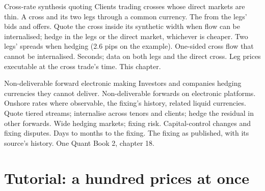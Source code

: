 \begin{strategyfile}{Cross-rate synthesis quoting}\label{strat:hf:fx-market-making:cross}
 Clients trading crosses whose direct markets are thin.
 A cross and its two legs through a common currency.
 The  from the legs' bids and offers.
 Quote the cross inside its synthetic width when flow can be internalised; hedge in the legs or the direct market,
whichever is cheaper.
 Two legs' spreads when hedging (2.6 pips on the example).
 One-sided cross flow that cannot be internalised.
 Seconds; data on both legs and the direct cross.
 Leg prices executable at the cross trade's time.
 This chapter.
\end{strategyfile}

\begin{strategyfile}{Non-deliverable forward electronic making}\label{strat:hf:fx-market-making:ndf}
 Investors and companies hedging currencies they cannot deliver.
 Non-deliverable forwards on electronic platforms.
 Onshore rates where observable, the fixing's history, related liquid currencies.
 Quote tiered streams; internalise across tenors and clients; hedge the residual in other forwards.
 Wide hedging markets; fixing risk.
 Capital-control changes and fixing disputes.
 Days to months to the fixing.
 The fixing as published, with its source's history.
 One Quant Book 2, chapter 18.
\end{strategyfile}

\section{Tutorial: a hundred prices at once}\label{tut:hf:fx-market-making:tut}

